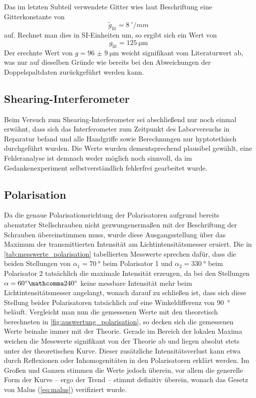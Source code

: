 \documentclass[ngerman]{scrartcl}
\begin{document}
Das im letzten Subteil verwendete Gitter wies laut Beschriftung eine Gitterkonstante von
\[\tilde{g}_{\text{lit}}=\SI{8}{'/mm}\]
auf. Rechnet man dies in SI-Einheiten um, so ergibt sich ein Wert von
\[g_{\text{lit}}=\SI{125}{\micro\meter}\]
Der erechnte Wert von \(g = \SI{96(9)}{\micro\meter}\) weicht signifikant vom Literaturwert ab, was nur auf dieselben Gründe wie bereits bei den Abweichungen der Doppelspaltdaten zurückgeführt werden kann.


\subsection{Shearing-Interferometer}
\label{subsec:diskussion_shearing}

Beim Versuch zum Shearing-Interferometer sei abschließend nur noch einmal erwähnt, dass sich das Interferometer zum Zeitpunkt des Laborversuchs in Reparatur befand und alle Handgriffe sowie Berechnungen nur hyptotethisch durchgeführt wurden. Die Werte wurden dementsprechend plausibel gewählt, eine Fehleranalyse ist demnach weder möglich noch sinnvoll, da im Gedankenexperiment selbstverständlich fehlerfrei gearbeitet wurde.


\subsection{Polarisation}
\label{subsec:diskussion_polarisation}

Da die genaue Polarisationsrichtung der Polarisatoren aufgrund bereits abenutzter Stellschrauben nicht gezwungenermaßen mit der Beschriftung der Schrauben übereinstimmen muss, wurde diese Ausgangsstellung über das Maximum der transmittierten Intensität am Lichtintensitätsmesser eruiert. Die in \autoref{tab:messwerte_polarisation} tabellierten Messwerte sprechen dafür, dass die beiden Stellungen von $\alpha_1 = \SI{70}{\degree}$ beim Polarisator 1 und $\alpha_2 = \SI{330}{\degree}$ beim Polarisator 2 tatsächlich die maximale Intensität erzeugen, da bei den Stellungen $\alpha = \SI{60}{\degree} \mathcomma \SI{240}{\degree}$ keine messbare Intensität mehr beim Lichtintensitätsmesser angelangt, wonach darauf zu schließen ist, dass sich diese Stellung beider Polarisatoren tatsächlich auf eine Winkeldifferenz von \SI{90}{\degree} beläuft. Vergleicht man nun die gemessenen Werte mit den theoretisch berechneten in \autoref{fig:auswertung_polarisation}, so decken sich die gemessenen Werte beinahe immer mit der Theorie. Gerade im Bereich der lokalen Maxima weichen die Messwerte signifikant von der Theorie ab und liegen absolut stets unter der theoretischen Kurve. Dieser zusätzliche Intensitätsverlust kann etwa durch Reflexionen oder Inhomogenitäten in den Polarisatoren erklärt werden. Im Großen und Ganzen stimmen die Werte jedoch überein, vor allem die generelle Form der Kurve -- ergo der Trend -- stimmt definitiv überein, wonach das Gesetz von Malus (\autoref{eq:malus}) verifiziert wurde.
\end{document}
